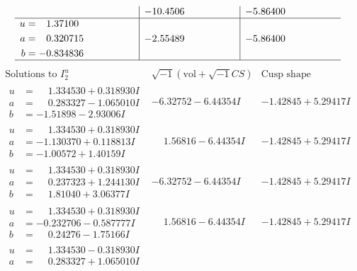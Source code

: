 \documentclass[1p]{elsarticle_modified}
\theoremstyle{definition}
\newcommand{\I}{\sqrt{-1}}
\begin{document}
$$\begin{array}{c|c|c}
 & -10.4506\phantom{ +0.000000I} & -5.86400\phantom{ +0.000000I} \\ \hline\begin{aligned}
u &= \phantom{-}1.37100\phantom{ +0.000000I} \\
a &= \phantom{-}0.320715\phantom{ +0.000000I} \\
b &= -0.834836\phantom{ +0.000000I}\end{aligned}
 & -2.55489\phantom{ +0.000000I} & -5.86400\phantom{ +0.000000I}\\
 \hline 
 \end{array}$$\newpage$$\begin{array}{c|c|c}  
\text{Solutions to }I^u_{2}& \I (\text{vol} + \sqrt{-1}CS) & \text{Cusp shape}\\
 \hline 
\begin{aligned}
u &= \phantom{-}1.334530 + 0.318930 I \\
a &= \phantom{-}0.283327 - 1.065010 I \\
b &= -1.51898 - 2.93006 I\end{aligned}
 & -6.32752 - 6.44354 I & -1.42845 + 5.29417 I \\ \hline\begin{aligned}
u &= \phantom{-}1.334530 + 0.318930 I \\
a &= -1.130370 + 0.118813 I \\
b &= -1.00572 + 1.40159 I\end{aligned}
 & \phantom{-}1.56816 - 6.44354 I & -1.42845 + 5.29417 I \\ \hline\begin{aligned}
u &= \phantom{-}1.334530 + 0.318930 I \\
a &= \phantom{-}0.237323 + 1.244130 I \\
b &= \phantom{-}1.81040 + 3.06377 I\end{aligned}
 & -6.32752 - 6.44354 I & -1.42845 + 5.29417 I \\ \hline\begin{aligned}
u &= \phantom{-}1.334530 + 0.318930 I \\
a &= -0.232706 - 0.587777 I \\
b &= \phantom{-}0.24276 - 1.75166 I\end{aligned}
 & \phantom{-}1.56816 - 6.44354 I & -1.42845 + 5.29417 I \\ \hline\begin{aligned}
u &= \phantom{-}1.334530 - 0.318930 I \\
a &= \phantom{-}0.283327 + 1.065010 I \\

\end{aligned}
\end{array}$$
\end{document}
